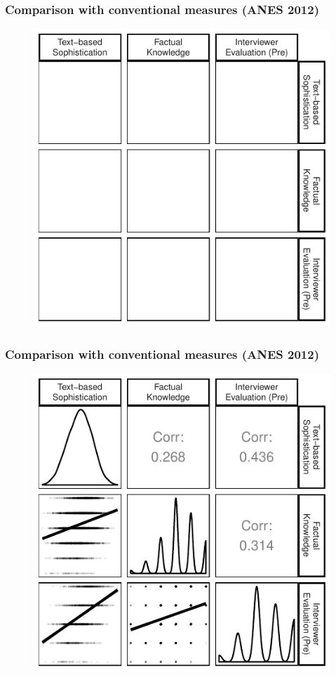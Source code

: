 \documentclass{beamer}
\begin{document}
\begin{frame} %
\frametitle{Comparison with conventional measures (ANES 2012)}
  \begin{figure}
  \includegraphics{../fig/corplot_empty.pdf}
  \end{figure}
\end{frame}
\begin{frame} %
\frametitle{Comparison with conventional measures (ANES 2012)}
  \begin{figure}
  \includegraphics{../fig/corplot_pres.pdf}
  \end{figure}
\end{frame}
\end{document}
